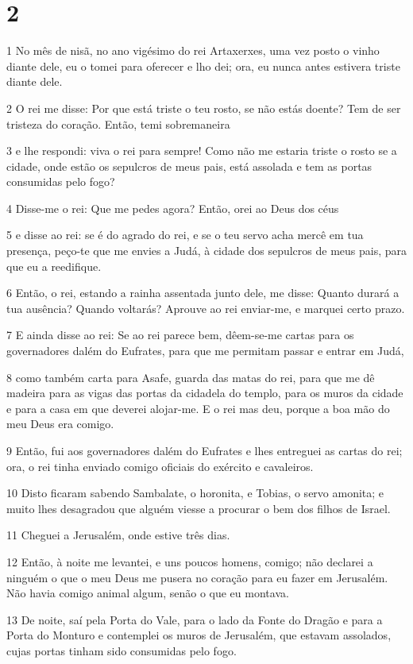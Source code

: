 \chapter{2}

\par 1 No mês de nisã, no ano vigésimo do rei Artaxerxes, uma vez posto o vinho diante dele, eu o tomei para oferecer e lho dei; ora, eu nunca antes estivera triste diante dele.
\par 2 O rei me disse: Por que está triste o teu rosto, se não estás doente? Tem de ser tristeza do coração. Então, temi sobremaneira
\par 3 e lhe respondi: viva o rei para sempre! Como não me estaria triste o rosto se a cidade, onde estão os sepulcros de meus pais, está assolada e tem as portas consumidas pelo fogo?
\par 4 Disse-me o rei: Que me pedes agora? Então, orei ao Deus dos céus
\par 5 e disse ao rei: se é do agrado do rei, e se o teu servo acha mercê em tua presença, peço-te que me envies a Judá, à cidade dos sepulcros de meus pais, para que eu a reedifique.
\par 6 Então, o rei, estando a rainha assentada junto dele, me disse: Quanto durará a tua ausência? Quando voltarás? Aprouve ao rei enviar-me, e marquei certo prazo.
\par 7 E ainda disse ao rei: Se ao rei parece bem, dêem-se-me cartas para os governadores dalém do Eufrates, para que me permitam passar e entrar em Judá,
\par 8 como também carta para Asafe, guarda das matas do rei, para que me dê madeira para as vigas das portas da cidadela do templo, para os muros da cidade e para a casa em que deverei alojar-me. E o rei mas deu, porque a boa mão do meu Deus era comigo.
\par 9 Então, fui aos governadores dalém do Eufrates e lhes entreguei as cartas do rei; ora, o rei tinha enviado comigo oficiais do exército e cavaleiros.
\par 10 Disto ficaram sabendo Sambalate, o horonita, e Tobias, o servo amonita; e muito lhes desagradou que alguém viesse a procurar o bem dos filhos de Israel.
\par 11 Cheguei a Jerusalém, onde estive três dias.
\par 12 Então, à noite me levantei, e uns poucos homens, comigo; não declarei a ninguém o que o meu Deus me pusera no coração para eu fazer em Jerusalém. Não havia comigo animal algum, senão o que eu montava.
\par 13 De noite, saí pela Porta do Vale, para o lado da Fonte do Dragão e para a Porta do Monturo e contemplei os muros de Jerusalém, que estavam assolados, cujas portas tinham sido consumidas pelo fogo.
